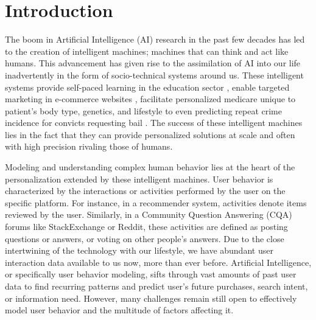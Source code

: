 \chapter{Introduction}
\label{chapter:introduction}

The boom in Artificial Intelligence (AI) research in the past few decades has led to the creation of intelligent machines; machines that can think and act like humans. This advancement has given rise to the assimilation of AI into our life inadvertently in the form of socio-technical systems around us. These intelligent systems provide self-paced learning in the education sector \cite{education}, enable targeted marketing in e-commerce websites \cite{targeted}, facilitate personalized medicare unique to patient's body type, genetics, and lifestyle \cite{medicine} to even predicting repeat crime incidence for convicts requesting bail \cite{bail}. The success of these intelligent machines lies in the fact that they can provide personalized solutions at scale and often with high precision rivaling those of humans.

Modeling and understanding complex human behavior lies at the heart of the personalization extended by these intelligent machines.
User behavior is characterized by the interactions or activities performed by the user on the specific platform. For instance, in a recommender system, activities denote items reviewed by the user. Similarly, in a Community Question Answering (CQA) forums like StackExchange or Reddit, these activities are defined as posting questions or answers, or voting on other people's answers.
Due to the close intertwining of the technology with our lifestyle, we have abundant user interaction data available to us now, more than ever before.
Artificial Intelligence, or specifically user behavior modeling, sifts through vast amounts of past user data to find recurring patterns and predict user's future purchases, search intent, or information need. However, many challenges remain still open to effectively model user behavior and the multitude of factors affecting it.

